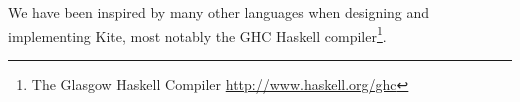 We have been inspired by many other languages when designing and implementing Kite, most notably the GHC Haskell compiler\footnote{The Glasgow Haskell Compiler \url{http://www.haskell.org/ghc}}.


